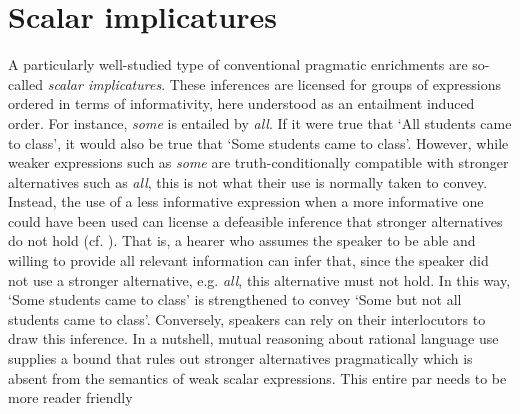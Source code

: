 \documentclass[a4paper]{article}
\newcommand{\tuple}[1]{\ensuremath{\left\langle #1 \right\rangle}}
\newcommand{\hl}[1]{\textcolor[rgb]{.8,.33,.0}{#1}}%
\begin{document}









\section{Scalar implicatures}
%
A particularly well-studied type of conventional pragmatic enrichments are so-called {\em scalar implicatures}. These inferences are licensed for groups of expressions ordered in terms of informativity, here understood as an entailment induced order. For instance, {\em some} is entailed by {\em all}. If it were true that `All students came to class', it would also be true that `Some students came to class'. However, while weaker expressions such as {\em some} are truth-conditionally compatible with stronger alternatives such as {\em all}, this is not what their use is normally taken to convey. Instead, the use of a less informative expression when a more informative one could have been used can license a defeasible inference that stronger alternatives do not hold (cf. \citealt{horn:1972,gazdar:1979}). That is, a hearer who assumes the speaker to be able and willing to provide all relevant information can infer that, since the speaker did not use a stronger alternative, e.g. {\em all}, this alternative must not hold. In this way, `Some students came to class' is strengthened to convey `Some but not all students came to class'. Conversely, speakers can rely on their interlocutors to draw this inference. In a nutshell, mutual reasoning about rational language use supplies a bound that rules out stronger alternatives pragmatically which is absent from the semantics of weak scalar expressions. \hl{This entire par needs to be more reader friendly}
\end{document}
